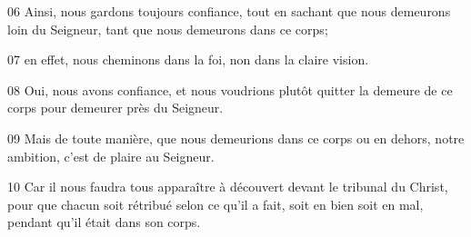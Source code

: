 
06 Ainsi, nous gardons toujours confiance, tout en sachant que nous demeurons loin du Seigneur, tant que nous demeurons dans ce corps;

07 en effet, nous cheminons dans la foi, non dans la claire vision.

08 Oui, nous avons confiance, et nous voudrions plutôt quitter la demeure de ce corps pour demeurer près du Seigneur.

09 Mais de toute manière, que nous demeurions dans ce corps ou en dehors, notre ambition, c’est de plaire au Seigneur.

10 Car il nous faudra tous apparaître à découvert devant le tribunal du Christ, pour que chacun soit rétribué selon ce qu’il a fait, soit en bien soit en mal, pendant qu’il était dans son corps.
